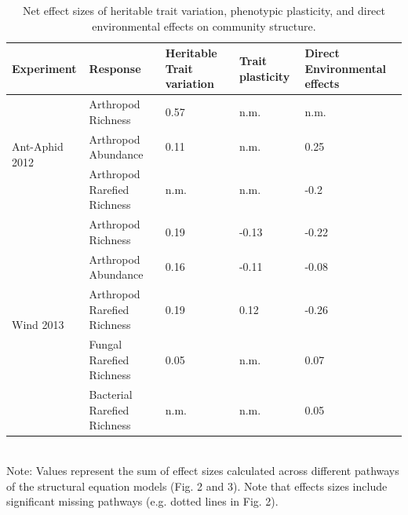 \documentclass[11pt]{article}
\begin{document}
\begin{table}
\caption{{Net effect sizes of heritable trait variation, phenotypic plasticity, and direct environmental effects on community structure. }}
\label{Table1}
\centering
\begin{tabular}{@{}lllll@{}}
\toprule
Experiment                      & Response                    & Heritable Trait variation & Trait plasticity & Direct Environmental effects \\ \midrule
\multirow{3}{*}{Ant-Aphid 2012} & Arthropod Richness          & 0.57                      & n.m.             & n.m.                         \\
                                & Arthropod Abundance         & 0.11                      & n.m.             & 0.25                         \\
                                & Arthropod Rarefied Richness & n.m.                      & n.m.             & -0.2                         \\
\multirow{5}{*}{Wind 2013}      & Arthropod Richness          & 0.19                      & -0.13            & -0.22                        \\
                                & Arthropod Abundance         & 0.16                      & -0.11            & -0.08                        \\
                                & Arthropod Rarefied Richness & 0.19                      & 0.12             & -0.26                        \\
                                & Fungal Rarefied Richness    & 0.05                      & n.m.             & 0.07                         \\
                                & Bacterial Rarefied Richness & n.m.                      & n.m.             & 0.05                         \\ \cmidrule(l){2-5} 
\end{tabular}
\bigskip{}
\\
{\footnotesize Note: Values represent the sum of effect sizes calculated across different pathways of the structural equation models (Fig. 2 and 3). Note that effects sizes include significant missing pathways (e.g. dotted lines in Fig. 2).}
\end{table}
\end{document}
